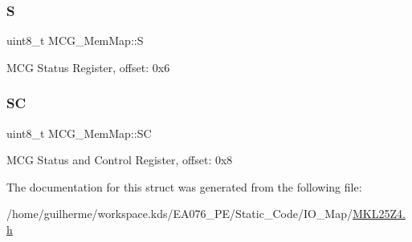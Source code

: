 \subsubsection{\texorpdfstring{S}{S}}
{\footnotesize\ttfamily uint8\+\_\+t M\+C\+G\+\_\+\+Mem\+Map\+::S}

M\+CG Status Register, offset\+: 0x6 \mbox{\label{struct_m_c_g___mem_map_aeff584aa52340d7c66dc06789ad05310}} 
\subsubsection{\texorpdfstring{SC}{SC}}
{\footnotesize\ttfamily uint8\+\_\+t M\+C\+G\+\_\+\+Mem\+Map\+::\+SC}

M\+CG Status and Control Register, offset\+: 0x8 

The documentation for this struct was generated from the following file\+:\begin{DoxyCompactItemize}
\item 
/home/guilherme/workspace.\+kds/\+E\+A076\+\_\+\+P\+E/\+Static\+\_\+\+Code/\+I\+O\+\_\+\+Map/\hyperlink{_m_k_l25_z4_8h}{M\+K\+L25\+Z4.\+h}\end{DoxyCompactItemize}
